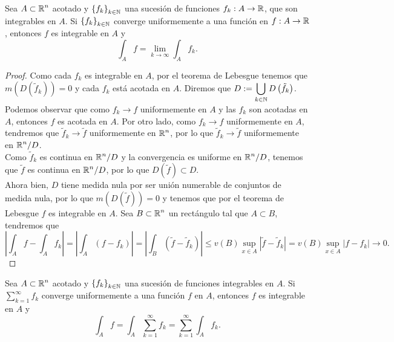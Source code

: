 \begin{theorem}
	Sea $\displaystyle A \subset \mathbb{R}^{n} $ acotado y $\displaystyle \left\{ f_{k}\right\} _{k \in \mathbb{N}} $ una sucesión de funciones $\displaystyle f_{k}: A \to \mathbb{R} $, que son integrables en $\displaystyle A $. Si $\displaystyle \left\{ f_{k}\right\} _{k \in \mathbb{N}} $ converge uniformemente a una función en $\displaystyle f : A \to \mathbb{R} $, entonces $\displaystyle f $ es integrable en $\displaystyle A $ y
	\[\int _{A}f =\lim_{k \to \infty}\int _{A}f_{k}  .\]
\end{theorem}
\begin{proof}
	Como cada $\displaystyle f_{k} $ es integrable en $\displaystyle A $, por el teorema de Lebesgue tenemos que $\displaystyle m\left(D\left(\tilde{f}_{k}\right)\right)=0 $ y cada $\displaystyle f_{k} $ está acotada en $\displaystyle A $. Diremos que $\displaystyle D : = \bigcup_{k \in \mathbb{N}}D\left(\tilde{f}_{k}\right) $. \\
	Podemos observar que como $\displaystyle f_{k}\to f $ uniformemente en $\displaystyle A $ y las $\displaystyle f_{k} $ son acotadas en $\displaystyle A $, entonces $\displaystyle f $ es acotada en $\displaystyle A $. Por otro lado, como $\displaystyle f_{k}\to f $ uniformemente en $\displaystyle A $, tendremos que $\displaystyle \tilde{f}_{k}\to \tilde{f} $ uniformemente en $\displaystyle \mathbb{R}^{n} $, por lo que $\displaystyle \tilde{f}_{k}\to \tilde{f} $ uniformemente en $\displaystyle \mathbb{R}^{n}/D $. \\
	Como $\displaystyle \tilde{f}_{k} $ es continua en $\displaystyle \mathbb{R}^{n}/D $ y la convergencia es uniforme en $\displaystyle \mathbb{R}^{n}/D $, tenemos que $\displaystyle \tilde{f} $ es continua en $\displaystyle \mathbb{R}^{n}/D $, por lo que $\displaystyle D\left(\tilde{f}\right)\subset D $. \\
	Ahora bien, $\displaystyle D $ tiene medida nula por ser unión numerable de conjuntos de medida nula, por lo que $\displaystyle m\left(D\left(\tilde{f}\right)\right)=0 $ y tenemos que por el teorema de Lebesgue $\displaystyle f $ es integrable en $\displaystyle A $. Sea $\displaystyle B \subset \mathbb{R}^{n} $ un rectángulo tal que $\displaystyle A \subset B $, tendremos que 
	\[ \left|\int _{A}f -\int _{A}f_{k} \right|= \left|\int _{A}\left(f-f_{k}\right) \right|= \left|\int _{B} \left(\tilde{f}-\tilde{f}_{k}\right) \right|\leq v\left(B\right)\sup_{x\in A} \left|\tilde{f}-\tilde{f}_{k}\right| = v\left(B\right)\sup_{x\in A} \left|f-f_{k}\right| \to 0 .\]
\end{proof}
\begin{colorary}
	Sea $\displaystyle A \subset \mathbb{R}^{n} $ acotado y $\displaystyle \left\{ f_{k}\right\} _{k \in \mathbb{N}} $ una sucesión de funciones integrables en $\displaystyle A $. Si $\displaystyle \sum^{\infty}_{k = 1}f_{k} $ converge uniformemente a una función $\displaystyle f $ en $\displaystyle A $, entonces $\displaystyle f $ es integrable en $\displaystyle A $ y
	\[\int _{A}f =\int _{A}\sum^{\infty}_{k = 1}f_{k} =\sum^{\infty}_{k = 1}\int _{A}f_{k}  .\]
\end{colorary}
